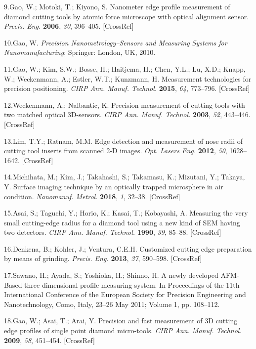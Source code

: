 \documentclass{article}
\begin{document}
\begin{hangpars}
9.\enspace Gao, W.; Motoki, T.; Kiyono, S. Nanometer edge profile measurement of diamond cutting tools by atomic force microscope with optical alignment sensor. \emph{Precis. Eng.} \textbf{2006}, \emph{30}, 396–405. [CrossRef]

10.\enspace Gao, W. \emph{Precision Nanometrology–Sensors and Measuring Systems for Nanomanufacturing}; Springer: London, UK, 2010.

11.\enspace Gao, W.; Kim, S.W.; Bosse, H.; Haitjema, H.; Chen, Y.L.; Lu, X.D.; Knapp, W.; Weckenmann, A.; Estler, W.T.; Kunzmann, H. Measurement technologies for precision positioning. \emph{CIRP Ann. Manuf. Technol.} \textbf{2015}, \emph{64}, 773–796. [CrossRef]

12.\enspace Weckenmann, A.; Nalbantic, K. Precision measurement of cutting tools with two matched optical 3D-sensors. \emph{CIRP Ann. Manuf. Technol.} \textbf{2003}, \emph{52}, 443–446. [CrossRef]

13.\enspace Lim, T.Y.; Ratnam, M.M. Edge detection and measurement of nose radii of cutting tool inserts from scanned 2-D images. \emph{Opt. Lasers Eng.} \textbf{2012}, \emph{50}, 1628–1642. [CrossRef]

14.\enspace Michihata, M.; Kim, J.; Takahashi, S.; Takamasu, K.; Mizutani, Y.; Takaya, Y. Surface imaging technique by an optically trapped microsphere in air condition. \emph{Nanomanuf. Metrol.} \textbf{2018}, \emph{1}, 32–38. [CrossRef]

15.\enspace Asai, S.; Taguchi, Y.; Horio, K.; Kasai, T.; Kobayashi, A. Measuring the very small cutting-edge radius for a diamond tool using a new kind of SEM having two detectors. \emph{CIRP Ann. Manuf. Technol.} \textbf{1990}, \emph{39}, 85–88. [CrossRef]

16.\enspace Denkena, B.; Kohler, J.; Ventura, C.E.H. Customized cutting edge preparation by means of grinding. \emph{Precis. Eng.} \textbf{2013}, \emph{37}, 590–598. [CrossRef]

17.\enspace Sawano, H.; Ayada, S.; Yoshioka, H.; Shinno, H. A newly developed AFM-Based three dimensional profile measuring system. In Proceedings of the 11th International Conference of the European Society for Precision Engineering and Nanotechnology, Como, Italy, 23–26 May 2011; Volume 1, pp. 108–112.

18.\enspace Gao, W.; Asai, T.; Arai, Y. Precision and fast measurement of 3D cutting edge profiles of single point diamond micro-tools. \emph{CIRP Ann. Manuf. Technol.} \textbf{2009}, \emph{58}, 451–454. [CrossRef]


\end{hangpars}
\end{document}
